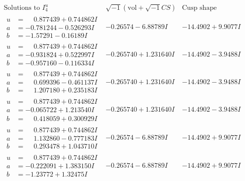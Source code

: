 \documentclass[1p]{elsarticle_modified}
\theoremstyle{definition}
\newcommand{\I}{\sqrt{-1}}
\begin{document}
$$\begin{array}{c|c|c}  
\text{Solutions to }I^u_{4}& \I (\text{vol} + \sqrt{-1}CS) & \text{Cusp shape}\\
 \hline 
\begin{aligned}
u &= \phantom{-}0.877439 + 0.744862 I \\
a &= -0.781244 - 0.526293 I \\
b &= -1.57291 - 0.16189 I\end{aligned}
 & -0.26574 - 6.88789 I & -14.4902 + 9.9077 I \\ \hline\begin{aligned}
u &= \phantom{-}0.877439 + 0.744862 I \\
a &= -0.931824 + 0.522997 I \\
b &= -0.957160 - 0.116334 I\end{aligned}
 & -0.265740 + 1.231640 I & -14.4902 - 3.9488 I \\ \hline\begin{aligned}
u &= \phantom{-}0.877439 + 0.744862 I \\
a &= \phantom{-}0.699396 - 0.461137 I \\
b &= \phantom{-}1.207180 + 0.235183 I\end{aligned}
 & -0.265740 + 1.231640 I & -14.4902 - 3.9488 I \\ \hline\begin{aligned}
u &= \phantom{-}0.877439 + 0.744862 I \\
a &= -0.065722 + 1.213540 I \\
b &= \phantom{-}0.418059 + 0.300929 I\end{aligned}
 & -0.265740 + 1.231640 I & -14.4902 - 3.9488 I \\ \hline\begin{aligned}
u &= \phantom{-}0.877439 + 0.744862 I \\
a &= \phantom{-}1.132860 - 0.777183 I \\
b &= \phantom{-}0.293478 + 1.043710 I\end{aligned}
 & -0.26574 - 6.88789 I & -14.4902 + 9.9077 I \\ \hline\begin{aligned}
u &= \phantom{-}0.877439 + 0.744862 I \\
a &= -0.222091 + 1.383150 I \\
b &= -1.23772 + 1.32475 I\end{aligned}
 & -0.26574 - 6.88789 I & -14.4902 + 9.9077 I \\ \hline\begin{aligned}

\end{aligned}
\end{array}$$
\end{document}
